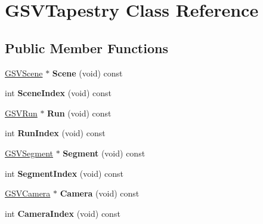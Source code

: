 \hypertarget{class_g_s_v_tapestry}{}\section{G\+S\+V\+Tapestry Class Reference}
\label{class_g_s_v_tapestry}
\subsection*{Public Member Functions}
\begin{DoxyCompactItemize}
\item 
\hyperlink{class_g_s_v_scene}{G\+S\+V\+Scene} $\ast$ {\bfseries Scene} (void) const \hypertarget{class_g_s_v_tapestry_a8a33e8c41c4434ad1ddd464cd77525a0}{}\label{class_g_s_v_tapestry_a8a33e8c41c4434ad1ddd464cd77525a0}

\item 
int {\bfseries Scene\+Index} (void) const \hypertarget{class_g_s_v_tapestry_a91b219b95184037660f5b058160d80b2}{}\label{class_g_s_v_tapestry_a91b219b95184037660f5b058160d80b2}

\item 
\hyperlink{class_g_s_v_run}{G\+S\+V\+Run} $\ast$ {\bfseries Run} (void) const \hypertarget{class_g_s_v_tapestry_a9ad4c9f03c37c61b80f979386bc3239a}{}\label{class_g_s_v_tapestry_a9ad4c9f03c37c61b80f979386bc3239a}

\item 
int {\bfseries Run\+Index} (void) const \hypertarget{class_g_s_v_tapestry_aba3c2b6a7bee477913ccc3b65d81015b}{}\label{class_g_s_v_tapestry_aba3c2b6a7bee477913ccc3b65d81015b}

\item 
\hyperlink{class_g_s_v_segment}{G\+S\+V\+Segment} $\ast$ {\bfseries Segment} (void) const \hypertarget{class_g_s_v_tapestry_a698456ee4a16b60646e7a36d0a031879}{}\label{class_g_s_v_tapestry_a698456ee4a16b60646e7a36d0a031879}

\item 
int {\bfseries Segment\+Index} (void) const \hypertarget{class_g_s_v_tapestry_acc7d519cda159dbb5a2db8afdf11cd32}{}\label{class_g_s_v_tapestry_acc7d519cda159dbb5a2db8afdf11cd32}

\item 
\hyperlink{class_g_s_v_camera}{G\+S\+V\+Camera} $\ast$ {\bfseries Camera} (void) const \hypertarget{class_g_s_v_tapestry_a494d36bd8bf008889692ad71647946cf}{}\label{class_g_s_v_tapestry_a494d36bd8bf008889692ad71647946cf}

\item 
int {\bfseries Camera\+Index} (void) const \hypertarget{class_g_s_v_tapestry_a62be4f6fcef4602894b353754108172b}{}\label{class_g_s_v_tapestry_a62be4f6fcef4602894b353754108172b}


\end{DoxyCompactItemize}
